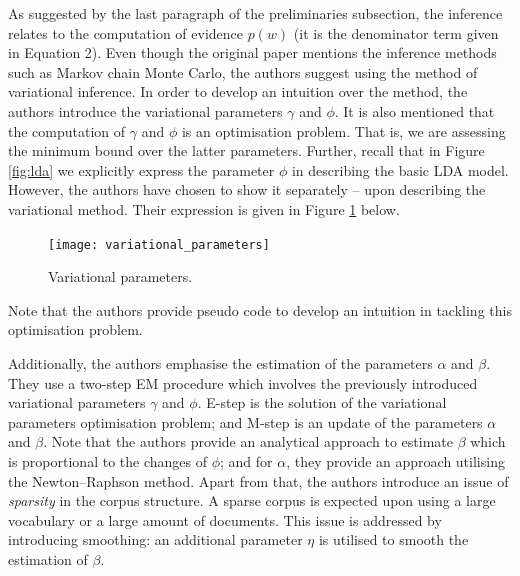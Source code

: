 \documentclass{mprop}
\begin{document}
\par As suggested by the last paragraph of the preliminaries subsection, the inference relates to the computation of evidence $p(w)$ (it is the denominator term given in Equation 2). Even though the original paper mentions the inference methods such as Markov chain Monte Carlo, the authors suggest using the method of variational inference. In order to develop an intuition over the method, the authors introduce the variational parameters $\gamma$ and $\phi$. It is also mentioned that the computation of $\gamma$ and $\phi$ is an optimisation problem. That is, we are assessing the minimum bound over the latter parameters. Further, recall that in Figure \ref{fig:lda} we explicitly express the parameter $\phi$ in describing the basic LDA model. However, the authors have chosen to show it separately -- upon describing the variational method. Their expression is given in Figure \ref{fig:var_par} below.
\begin{figure}[H]
  \centering
  \texttt{[image: variational\_parameters]}
  \caption{Variational parameters.}
  \label{fig:var_par}
\end{figure}
Note that the authors provide pseudo code to develop an intuition in tackling this optimisation problem.

\par Additionally, the authors emphasise the estimation of the parameters $\alpha$ and $\beta$. They use a two-step EM procedure which involves the previously introduced variational parameters $\gamma$ and $\phi$. E-step is the solution of the variational parameters optimisation problem; and M-step is an update of the parameters $\alpha$ and $\beta$. Note that the authors provide an analytical approach to estimate $\beta$ which is proportional to the changes of $\phi$; and for $\alpha$, they provide an approach utilising the Newton--Raphson method. Apart from that, the authors introduce an issue of \textit{sparsity} in the corpus structure. A sparse corpus is expected upon using a large vocabulary or a large amount of documents. This issue is addressed by introducing smoothing: an additional parameter $\eta$ is utilised to smooth the estimation of $\beta$. 
\end{document}
